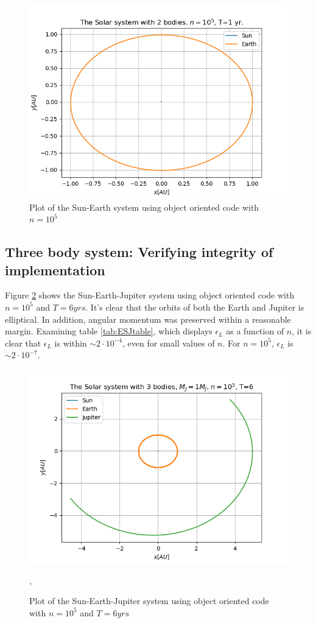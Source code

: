 \documentclass[%
oneside,                 %
final,                   %
10pt]{article}
\begin{document}
\begin{figure}[!htb]
        \centering 
         \includegraphics[scale=.6]{../Results/SunEarthOONj5T1png} 
        \caption{Plot of the Sun-Earth system using object oriented code  with $n=10^5$}
        \label{fig:twobodyplotOO}   
\end{figure}  

\subsection{Three body system: Verifying integrity of implementation}
Figure \ref{fig:ESJ} shows the Sun-Earth-Jupiter system using object oriented code with $n=10^5$ and $T=6 yrs$. It's clear that the orbits of both the Earth and Jupiter is elliptical. In addition, angular momentum was preserved within a reasonable margin. Examining table \ref{tab:ESJtable}, which displays $\epsilon_L$ as a function of $n$, it is  clear that $\epsilon_L$ is within $\sim 2\cdot 10^{-4}$, even for small values of $n$. For $n=10^5$, $\epsilon_L$ is $\sim 2 \cdot 10^{-7}$.

\begin{figure}[!htb]
        \centering 
         \includegraphics[scale=.6]{../Results/OOthreeBodyEarthSun1Jupiterj5T6.png} 
        \caption{Plot of the Sun-Earth-Jupiter system using object oriented code with $n=10^5$ and $T=6 yrs$},
        \label{fig:ESJ}   
\end{figure}  
\end{document}

